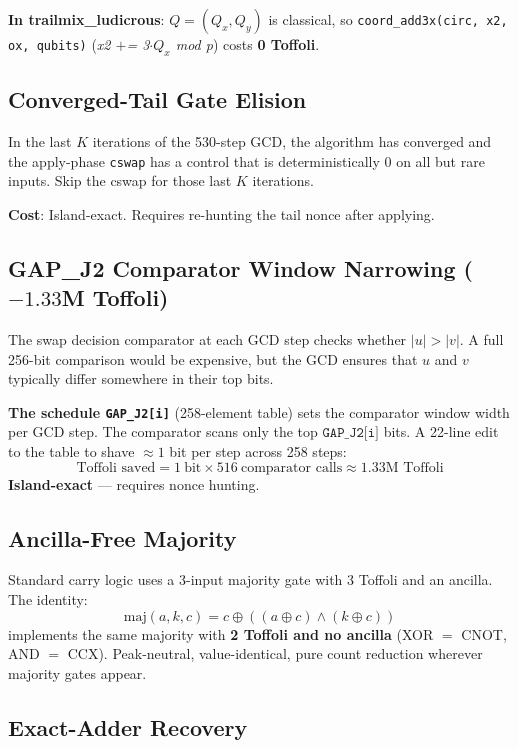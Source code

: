 \documentclass[11pt,a4paper]{article}
\begin{document}
\textbf{In trailmix\_ludicrous}: $Q = (Q_x, Q_y)$ is classical, so \texttt{coord\_add3x(circ, x2,
ox, qubits)} (\textit{x2 $\mathrel{+}$= 3$\cdot Q_x$ mod p}) costs \textbf{0 Toffoli}.

\subsection{Converged-Tail Gate Elision}

In the last $K$ iterations of the 530-step GCD, the algorithm has converged and the apply-phase
\texttt{cswap} has a control that is deterministically 0 on all but rare inputs. Skip the cswap
for those last $K$ iterations.

\textbf{Cost}: Island-exact. Requires re-hunting the tail nonce after applying.

\subsection{GAP\_J2 Comparator Window Narrowing ($-1.33$M Toffoli)}

The swap decision comparator at each GCD step checks whether $|u| > |v|$. A full 256-bit
comparison would be expensive, but the GCD ensures that $u$ and $v$ typically differ somewhere
in their top bits.

\textbf{The schedule \texttt{GAP\_J2[i]}} (258-element table) sets the comparator window width
per GCD step. The comparator scans only the top $\texttt{GAP\_J2[i]}$ bits. A 22-line edit to the
table to shave $\approx1$ bit per step across 258 steps:
\[
  \text{Toffoli saved} = 1\ \text{bit} \times 516\ \text{comparator calls} \approx 1.33\text{M Toffoli}
\]
\textbf{Island-exact} --- requires nonce hunting.

\subsection{Ancilla-Free Majority}
\label{sec:majority}

Standard carry logic uses a 3-input majority gate with 3 Toffoli and an ancilla. The identity:
\[
  \text{maj}(a, k, c) = c \oplus ((a \oplus c) \wedge (k \oplus c))
\]
implements the same majority with \textbf{2 Toffoli and no ancilla} (XOR $=$ CNOT, AND $=$ CCX).
Peak-neutral, value-identical, pure count reduction wherever majority gates appear.

\subsection{Exact-Adder Recovery}
\end{document}
